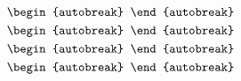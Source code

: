 \documentclass[twocolumn]{article}
\begin{document}
\begin{align}
  \begin{autobreak}
    
  \end{autobreak}
  \\
  \begin{autobreak}
    
  \end{autobreak}
  \\
  \begin{autobreak}
    
  \end{autobreak}
  \\
  \begin{autobreak}
    
  \end{autobreak}
\end{align}
\end{document}
